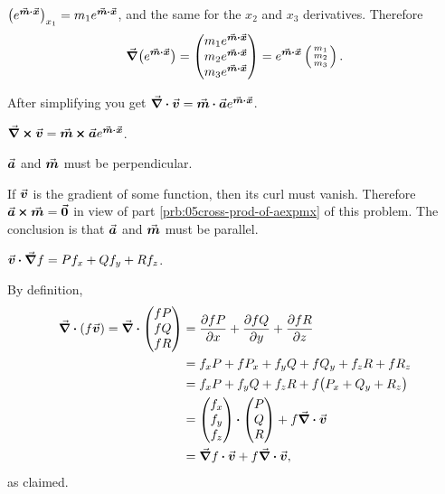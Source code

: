 \relax
{}

\item[{\bf(2i)}]

$\bigl(e^{\vm\dpp\vx}\bigr)_{x_1} = m_1e^{\vm\dpp\vx}$, and the same for the $x_2$
and $x_3$ derivatives.  Therefore
\[
\nab\bigl(e^{\vm\dpp\vx}\bigr) =
\vek m_1e^{\vm\dpp\vx}\\m_2e^{\vm\dpp\vx} \\ m_3e^{\vm\dpp\vx} \tor
=e^{\vm\dpp\vx} \tvek m_1\\m_2\\m_3\ttor.
\]
\bigskip

\item[{\bf(2ii)}]

After simplifying you get $\nab\dpp\vv = \vm\dpp\va e^{\vm\dpp\vx}$.
\bigskip

\item[{\bf(2iii)}]

$\nab\cp\vv = \vm\cp\va e^{\vm\dpp\vx}$.
\bigskip

\item[{\bf(2iv)}]

$\va$ and $\vm$ must be perpendicular.
\bigskip

\item[{\bf(2v)}]

If $\vv$ is the gradient of some function, then its curl must vanish.
Therefore $\va\cp\vm=\vvv0$ in view of part \ref{prb:05cross-prod-of-aexpmx}
of this problem.  The conclusion is that $\va$ and $\vm$ must
be parallel.
\bigskip

\item[{\bf(3)}]

$\vv\dpp\nab f = P f_x + Q f_y + R f_z$.
\bigskip

\item[{\bf(4i)}]

By definition,
\begin{align*}
  \nab\dpp(f\vv) = \nab \dpp \vek fP\\fQ \\fR\tor
  &= \pdd{fP}x + \pdd{fQ}y + \pdd{fR}z  \\
  &= f_x P + fP_x + f_yQ + fQ_y + f_z R + fR_z\\
  &= f_x P +f_y Q + f_z R + f\bigl(P_x+Q_y+R_z\bigr) \\
  &= \vek f_x\\ f_y\\ f_z\tor \dpp \vek P\\Q\\R\tor + f \nab\dpp\vv \\
  &= \nab f\dpp \vv + f\nab \dpp\vv,
\end{align*}
as claimed.
\bigskip

